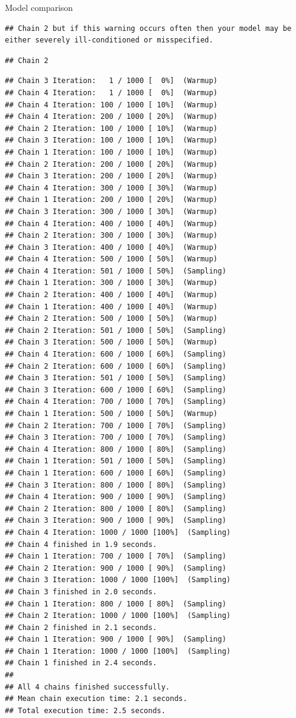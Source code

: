 \documentclass[
  ignorenonframetext,
]{beamer}
\begin{document}
\begin{frame}[fragile]{Model comparison}
\begin{verbatim}
## Chain 2 but if this warning occurs often then your model may be either severely ill-conditioned or misspecified.
\end{verbatim}

\begin{verbatim}
## Chain 2
\end{verbatim}

\begin{verbatim}
## Chain 3 Iteration:   1 / 1000 [  0%]  (Warmup) 
## Chain 4 Iteration:   1 / 1000 [  0%]  (Warmup) 
## Chain 4 Iteration: 100 / 1000 [ 10%]  (Warmup) 
## Chain 4 Iteration: 200 / 1000 [ 20%]  (Warmup) 
## Chain 2 Iteration: 100 / 1000 [ 10%]  (Warmup) 
## Chain 3 Iteration: 100 / 1000 [ 10%]  (Warmup) 
## Chain 1 Iteration: 100 / 1000 [ 10%]  (Warmup) 
## Chain 2 Iteration: 200 / 1000 [ 20%]  (Warmup) 
## Chain 3 Iteration: 200 / 1000 [ 20%]  (Warmup) 
## Chain 4 Iteration: 300 / 1000 [ 30%]  (Warmup) 
## Chain 1 Iteration: 200 / 1000 [ 20%]  (Warmup) 
## Chain 3 Iteration: 300 / 1000 [ 30%]  (Warmup) 
## Chain 4 Iteration: 400 / 1000 [ 40%]  (Warmup) 
## Chain 2 Iteration: 300 / 1000 [ 30%]  (Warmup) 
## Chain 3 Iteration: 400 / 1000 [ 40%]  (Warmup) 
## Chain 4 Iteration: 500 / 1000 [ 50%]  (Warmup) 
## Chain 4 Iteration: 501 / 1000 [ 50%]  (Sampling) 
## Chain 1 Iteration: 300 / 1000 [ 30%]  (Warmup) 
## Chain 2 Iteration: 400 / 1000 [ 40%]  (Warmup) 
## Chain 1 Iteration: 400 / 1000 [ 40%]  (Warmup) 
## Chain 2 Iteration: 500 / 1000 [ 50%]  (Warmup) 
## Chain 2 Iteration: 501 / 1000 [ 50%]  (Sampling) 
## Chain 3 Iteration: 500 / 1000 [ 50%]  (Warmup) 
## Chain 4 Iteration: 600 / 1000 [ 60%]  (Sampling) 
## Chain 2 Iteration: 600 / 1000 [ 60%]  (Sampling) 
## Chain 3 Iteration: 501 / 1000 [ 50%]  (Sampling) 
## Chain 3 Iteration: 600 / 1000 [ 60%]  (Sampling) 
## Chain 4 Iteration: 700 / 1000 [ 70%]  (Sampling) 
## Chain 1 Iteration: 500 / 1000 [ 50%]  (Warmup) 
## Chain 2 Iteration: 700 / 1000 [ 70%]  (Sampling) 
## Chain 3 Iteration: 700 / 1000 [ 70%]  (Sampling) 
## Chain 4 Iteration: 800 / 1000 [ 80%]  (Sampling) 
## Chain 1 Iteration: 501 / 1000 [ 50%]  (Sampling) 
## Chain 1 Iteration: 600 / 1000 [ 60%]  (Sampling) 
## Chain 3 Iteration: 800 / 1000 [ 80%]  (Sampling) 
## Chain 4 Iteration: 900 / 1000 [ 90%]  (Sampling) 
## Chain 2 Iteration: 800 / 1000 [ 80%]  (Sampling) 
## Chain 3 Iteration: 900 / 1000 [ 90%]  (Sampling) 
## Chain 4 Iteration: 1000 / 1000 [100%]  (Sampling) 
## Chain 4 finished in 1.9 seconds.
## Chain 1 Iteration: 700 / 1000 [ 70%]  (Sampling) 
## Chain 2 Iteration: 900 / 1000 [ 90%]  (Sampling) 
## Chain 3 Iteration: 1000 / 1000 [100%]  (Sampling) 
## Chain 3 finished in 2.0 seconds.
## Chain 1 Iteration: 800 / 1000 [ 80%]  (Sampling) 
## Chain 2 Iteration: 1000 / 1000 [100%]  (Sampling) 
## Chain 2 finished in 2.1 seconds.
## Chain 1 Iteration: 900 / 1000 [ 90%]  (Sampling) 
## Chain 1 Iteration: 1000 / 1000 [100%]  (Sampling) 
## Chain 1 finished in 2.4 seconds.
## 
## All 4 chains finished successfully.
## Mean chain execution time: 2.1 seconds.
## Total execution time: 2.5 seconds.
\end{verbatim}


\end{frame}
\end{document}
